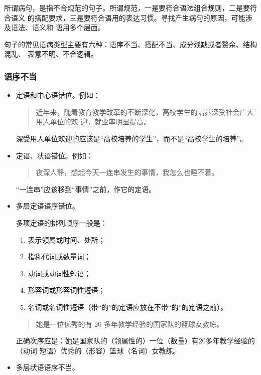 \documentclass[final,oneside]{ctexbook}
\newenvironment{equotation}{\begin{quotation}\kaishu}{\end{quotation}}
\begin{document}
所谓病句，是指不合规范的句子。所谓规范，一是要符合语法组合规则，二是要符合语义
的搭配要求，三是要符合语用的表达习惯。寻找产生病句的原因，可能涉及语法、语义和
语用多个层面。

句子的常见语病类型主要有六种：语序不当、搭配不当、成分残缺或者赘余、结构混乱、
表意不明、不合逻辑。

\subsubsection{语序不当}

\begin{itemize}

  \item 定语和中心语错位。例如：
    \begin{equotation}
      近年来，随着教育教学改革的不断深化，高校学生的培养深受社会广大用人单位的欢
      迎，就业率明显提高。
    \end{equotation}
    深受用人单位欢迎的应该是“高校培养的学生”，而不是“高校学生的培养”。

  \item 定语、状语错位。例如：
    \begin{equotation}
      夜深人静，想起今天一连串发生的事情，我怎么也睡不着。
    \end{equotation}
    “一连串”应该移到“事情”之前，作它的定语。

  \item 多层定语语序错位。

    多项定语的排列顺序一般是：
    \begin{enumerate}
      \item 表示领属或时间、处所；
      \item 指称代词或数量词；
      \item 动词或动词性短语；
      \item 形容词或形容词性短语；
      \item 名词或名词性短语（带“的”的定语应放在不带“的”的定语之前）。
    \end{enumerate}

    \begin{equotation}
      她是一位优秀的有 20 多年教学经验的国家队的篮球女教练。
    \end{equotation}
    正确次序应是：她是国家队的（领属性的）一位（数量）有20多年教学经验的（动词
    短语）优秀的（形容）篮球（名词）女教练。

  \item 多层状语语序不当。


\end{itemize}
\end{document}
